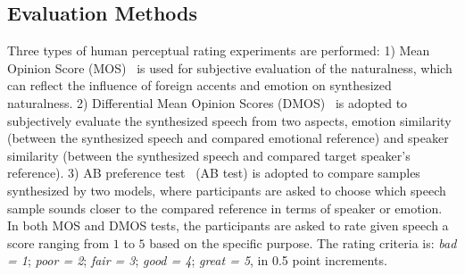 \documentclass[journal,comsoc]{IEEEtran}
\begin{document}
\subsection{Evaluation Methods} 
\label{sc:database}

Three types of human perceptual rating experiments are performed:
1) Mean Opinion Score (MOS)~\cite{shang2021incorporating} is used for subjective evaluation of the naturalness, which can reflect the influence of foreign accents and emotion on synthesized naturalness.
2) Differential Mean Opinion Scores (DMOS)~\cite{Li2021ControllableCE} is adopted to subjectively evaluate the synthesized speech from two aspects, emotion similarity (between the synthesized speech and compared emotional reference) and speaker similarity (between the synthesized speech and compared target speaker's reference).
3) AB preference test~\cite{an2022disentangling} (AB test) is adopted to compare samples synthesized by two models, where participants are asked to choose which speech sample sounds closer to the compared reference in terms of speaker or emotion. 
In both MOS and DMOS tests, the participants are asked to rate given speech a score ranging from $1$ to $5$ based on the specific purpose.
The rating criteria is: \textit{bad = 1}; \textit{poor = 2}; \textit{fair = 3}; \textit{good = 4}; \textit{great = 5}, in 0.5 point increments.
\end{document}
